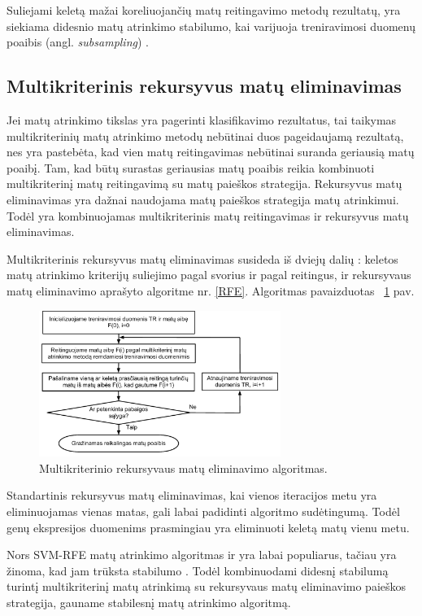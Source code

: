 Suliejami keletą mažai koreliuojančių matų reitingavimo metodų rezultatų, yra siekiama didesnio matų atrinkimo stabilumo, kai varijuoja treniravimosi duomenų poaibis (angl. \textit{subsampling}) \cite{yang2011robust}.

\subsection{Multikriterinis rekursyvus matų eliminavimas}

Jei matų atrinkimo tikslas yra pagerinti klasifikavimo rezultatus, tai taikymas multikriterinių matų atrinkimo metodų nebūtinai duos pageidaujamą rezultatą, nes yra pastebėta, kad vien matų reitingavimas nebūtinai suranda geriausią matų poaibį. Tam, kad būtų surastas geriausias matų poaibis reikia kombinuoti multikriterinį matų reitingavimą su matų paieškos strategija. Rekursyvus matų eliminavimas yra dažnai naudojama matų paieškos strategija matų atrinkimui. Todėl yra kombinuojamas multikriterinis matų reitingavimas ir rekursyvus matų eliminavimas.

Multikriterinis rekursyvus matų eliminavimas susideda iš dviejų dalių \cite{yang2011robust}: keletos matų atrinkimo kriterijų suliejimo pagal svorius ir pagal reitingus, ir rekursyvaus matų eliminavimo aprašyto algoritme nr. \ref{RFE}. Algoritmas pavaizduotas ~\ref{fig:figure6} pav.
\begin{figure}
 \centering
 \includegraphics[width=0.7\textwidth]{images/mcf-rfe_procedure.pdf}
 \caption{Multikriterinio rekursyvaus matų eliminavimo algoritmas.}
 \label{fig:figure6}
\end{figure}

Standartinis rekursyvus matų eliminavimas, kai vienos iteracijos metu yra eliminuojamas vienas matas, gali labai padidinti algoritmo sudėtingumą. Todėl genų ekspresijos duomenims prasmingiau yra eliminuoti keletą matų vienu metu.

Nors SVM-RFE matų atrinkimo algoritmas ir yra labai populiarus, tačiau yra žinoma, kad jam trūksta stabilumo \cite{guyon2002gene}. Todėl kombinuodami didesnį stabilumą turintį multikriterinį matų atrinkimą su rekursyvaus matų eliminavimo paieškos strategija, gauname stabilesnį matų atrinkimo algoritmą.

